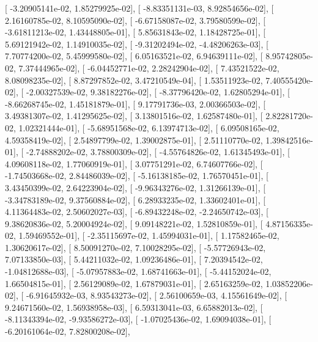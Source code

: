 \documentclass{article}
\begin{document}
       [ -3.20905141e-02,   1.85279925e-02],
       [ -8.83351131e-03,   8.92854656e-02],
       [  2.16160785e-02,   8.10595090e-02],
       [ -6.67158087e-02,   3.79580599e-02],
       [ -3.61811213e-02,   1.43448805e-01],
       [  5.85631843e-02,   1.18428725e-01],
       [  5.69121942e-02,   1.14910035e-02],
       [ -9.31202494e-02,  -4.48206263e-03],
       [  7.70774200e-02,   5.45999580e-02],
       [  6.05163521e-02,   6.94639111e-02],
       [  8.95742805e-02,   7.37444965e-02],
       [ -6.04452771e-02,   2.28242904e-02],
       [  7.43521522e-02,   8.08098235e-02],
       [  8.87297852e-02,   3.47210549e-04],
       [  1.53511923e-02,   7.40555420e-02],
       [ -2.00327539e-02,   9.38182276e-02],
       [ -8.37796420e-02,   1.62805294e-01],
       [ -8.66268745e-02,   1.45181879e-01],
       [  9.17791736e-03,   2.00366503e-02],
       [  3.49381307e-02,   1.41295625e-02],
       [  3.13801516e-02,   1.62587480e-01],
       [  2.82281720e-02,   1.02321444e-01],
       [ -5.68951568e-02,   6.13974713e-02],
       [  6.09508165e-02,   4.59358419e-02],
       [  2.54897799e-02,   1.39002875e-01],
       [  2.51110770e-02,   1.39842516e-01],
       [ -2.74888202e-02,   3.78800309e-02],
       [ -4.55764826e-02,   1.61345493e-01],
       [  4.09608118e-02,   1.77060919e-01],
       [  3.07751291e-02,   6.74607766e-02],
       [ -1.74503668e-02,   2.84486039e-02],
       [ -5.16138185e-02,   1.76570451e-01],
       [  3.43450399e-02,   2.64223904e-02],
       [ -9.96343276e-02,   1.31266139e-01],
       [ -3.34783189e-02,   9.37560884e-02],
       [  6.28933235e-02,   1.33602401e-01],
       [  4.11364483e-02,   2.50602027e-03],
       [ -6.89432248e-02,  -2.24650742e-03],
       [  9.38620836e-02,   5.20004924e-02],
       [  9.09148221e-02,   1.52810859e-01],
       [  4.87156335e-02,   1.59469552e-01],
       [ -2.35115697e-02,   1.45994031e-01],
       [  1.17582465e-02,   1.30620617e-02],
       [  8.50091270e-02,   7.10028295e-02],
       [ -5.57726943e-02,   7.07133850e-03],
       [  5.44211032e-02,   1.09236486e-01],
       [  7.20394542e-02,  -1.04812688e-03],
       [ -5.07957883e-02,   1.68741663e-01],
       [ -5.44152024e-02,   1.66504815e-01],
       [  2.56129089e-02,   1.67879031e-01],
       [  2.65163259e-02,   1.03852206e-02],
       [ -6.91645932e-03,   8.93543273e-02],
       [  2.56100659e-03,   4.15561649e-02],
       [  9.24671560e-02,   1.56938958e-03],
       [  6.59313041e-03,   6.65882013e-02],
       [ -8.11343394e-02,  -9.93586272e-03],
       [ -1.07025436e-02,   1.69094038e-01],
       [ -6.20161064e-02,   7.82800208e-02],
\end{document}
